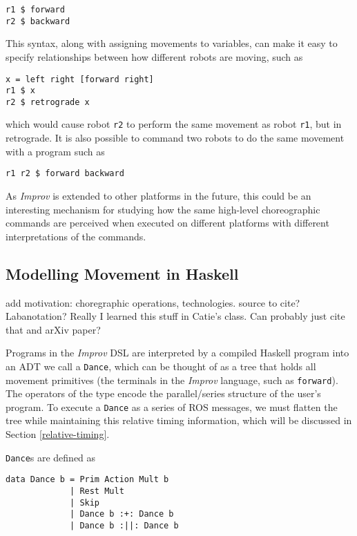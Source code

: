 \documentclass[sigconf]{acmart}
\begin{document}
\begin{verbatim}
r1 $ forward
r2 $ backward
\end{verbatim}

This syntax, along with assigning movements to variables, can make it easy to
specify relationships between how different robots are moving, such as

\begin{verbatim}
x = left right [forward right]
r1 $ x
r2 $ retrograde x
\end{verbatim}


which would cause robot \texttt{r2} to perform the same movement as
robot \texttt{r1}, but in retrograde. It is also possible to command two robots
to do the same movement with a program such as

\begin{verbatim}
r1 r2 $ forward backward
\end{verbatim}

As \emph{Improv} is extended to other platforms in the future, this could be an
interesting mechanism for studying how the same high-level choreographic
commands are perceived when executed on different platforms with different
interpretations of the commands.

\subsection{Modelling Movement in
Haskell}\label{modelling-movement-in-haskell}

{\color{red}add motivation: choregraphic operations, technologies. source to
cite? Labanotation? Really I learned this stuff in Catie's class. Can probably
just cite that and arXiv paper?}

Programs in the \emph{Improv} DSL are interpreted by a compiled Haskell
program into an ADT we call a \texttt{Dance}, which can be thought of as
a tree that holds all movement primitives (the terminals in the
\emph{Improv} language, such as \texttt{forward}). The operators of the
type encode the parallel/series structure of the user's program. To
execute a \texttt{Dance} as a series of ROS messages, we must flatten
the tree while maintaining this relative timing information, which will
be discussed in Section \ref{relative-timing}.

\texttt{Dance}s are defined as

\begin{verbatim}
data Dance b = Prim Action Mult b
             | Rest Mult
             | Skip
             | Dance b :+: Dance b
             | Dance b :||: Dance b
\end{verbatim}
\end{document}
